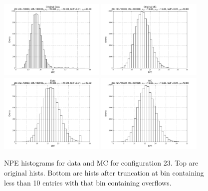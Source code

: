 \begin{figure}[htbp] \begin{center} 
\includegraphics[width=0.45\textwidth]{../FIGURES/23/FIG_Original_Data.pdf} 
\includegraphics[width=0.45\textwidth]{../FIGURES/23/FIG_Original_MC.pdf} 
\includegraphics[width=0.45\textwidth]{../FIGURES/23/FIG_Data.pdf} 
\includegraphics[width=0.45\textwidth]{../FIGURES/23/FIG_MC.pdf} 
\caption{NPE histograms for data and MC for configuration 23. Top are original hists. Bottom are hists after truncation at bin containing less than 10 entries with that bin containing overflows.} 
\label{tab:npe_23} 
\end{center} \end{figure} 

 